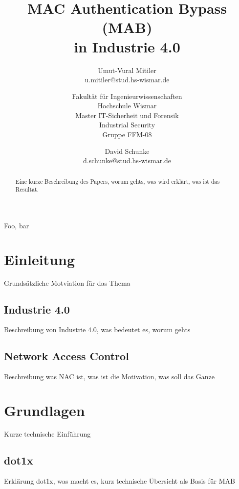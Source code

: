 \documentclass[conference]{IEEEtran}
\begin{document}
\title{MAC Authentication Bypass (MAB)\\ in Industrie 4.0}
\author{
	Umut-Vural Mitiler\\
	u.mitiler@stud.hs-wismar.de
	\and
	Fakultät für Ingenieurwissenschaften\\
	Hochschule Wismar\\
	Master IT-Sicherheit und Forensik\\
	Industrial Security\\
	Gruppe FFM-08
	\and
	David Schunke\\
	d.schunke@stud.hs-wismar.de
}

\maketitle

\thispagestyle{plain}
\pagestyle{plain}

%

\begin{abstract}
Eine kurze Beschreibung des Papers, worum gehts, was wird erklärt, was ist das Resultat.
\end{abstract}

\begin{IEEEkeywords}
Foo, bar	
\end{IEEEkeywords}

%

\section{Einleitung}
Grundsätzliche Motviation für das Thema

\subsection{Industrie 4.0}
Beschreibung von Industrie 4.0, was bedeutet es, worum gehts

\subsection{Network Access Control}
Beschreibung was NAC ist, was ist die Motivation, was soll das Ganze

%

\section{Grundlagen}
Kurze technische Einführung

\subsection{dot1x}
Erklärung dot1x, was macht es, kurz technische Übersicht als Basis für MAB
\end{document}
